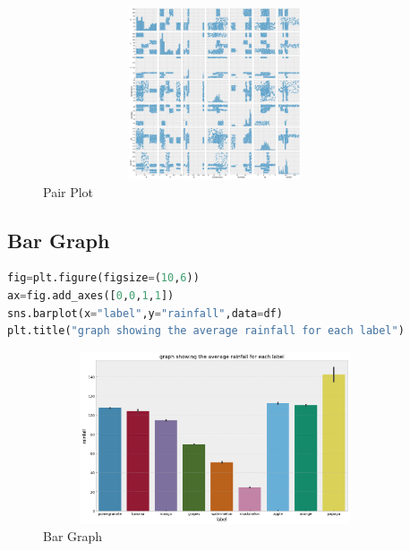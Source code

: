 \begin{figure}[h]
\centering
 \footnotesize
 \includegraphics[width=4in,height=2in]{pair.png}
\caption{Pair Plot}
\label{fig:unevenlight}
\end{figure} 
\subsection{Bar Graph}
\begin{lstlisting}[language=Python,basicstyle=\fontsize{9}{11}\selectfont]
fig=plt.figure(figsize=(10,6))
ax=fig.add_axes([0,0,1,1])
sns.barplot(x="label",y="rainfall",data=df)
plt.title("graph showing the average rainfall for each label")
\end{lstlisting}
 
\begin{figure}[h]
\centering
 \footnotesize
 \includegraphics[width=4in,height=2in]{barplot.png}
\caption{Bar Graph}
\label{fig:unevenlight}
\end{figure} 
